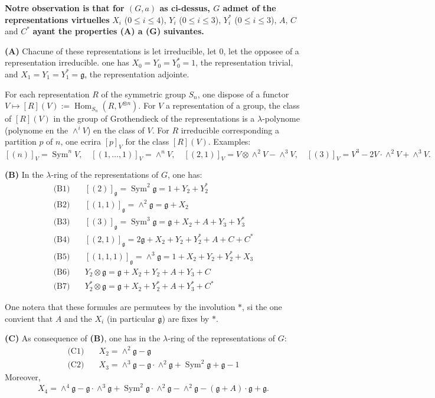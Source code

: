 \documentclass[11pt,a4paper]{article}
\DeclareMathOperator{\Sym}{Sym}
\DeclareMathOperator{\Hom}{Hom}
\newcommand{\frg}{\mathfrak{g}}
\begin{document}
\textbf{Notre observation is that for $(G, a)$ as ci-dessus, $G$ admet of the representations virtuelles}
$X_i$ ($0 \leq i \leq 4$), $Y_i$ ($0 \leq i \leq 3$), $Y_i^*$ ($0 \leq i \leq 3$), $A$, $C$ and $C^*$
\textbf{ayant the properties (A) a (G) suivantes.}

\medskip
\noindent\textbf{(A)} Chacune of these representations is let irreducible, let $0$, let the opposee of a representation irreducible. one has $X_0 = Y_0 = Y_0^* = 1$, the representation trivial, and $X_1 = Y_1 = Y_1^* = \frg$, the representation adjointe.

\medskip
\noindent For each representation $R$ of the symmetric group $S_n$, one dispose of a functor $V \mapsto [R](V) := \Hom_{S_n}(R, V^{\otimes n})$. For $V$ a representation of a group, the class of $[R](V)$ in the group of Grothendieck of the representations is a $\lambda$-polynome (polynome en the $\wedge^i V$) en the class of $V$. For $R$ irreducible corresponding a partition $p$ of $n$, one ecrira $[p]_V$ for the class $[R](V)$. Examples:
$$
[(n)]_V = \Sym^n V, \quad [(1, \ldots, 1)]_V = \wedge^n V, \quad [(2,1)]_V = V \otimes \wedge^2 V - \wedge^3 V, \quad [(3)]_V = V^3 - 2V \cdot \wedge^2 V + \wedge^3 V.
$$

\medskip
\noindent\textbf{(B)} In the $\lambda$-ring of the representations of $G$, one has:
\begin{align*}
\text{(B1)} \quad & [(2)]_{\frg} = \Sym^2 \frg = 1 + Y_2 + Y_2^* \\
\text{(B2)} \quad & [(1,1)]_{\frg} = \wedge^2 \frg = \frg + X_2 \\
\text{(B3)} \quad & [(3)]_{\frg} = \Sym^3 \frg = \frg + X_2 + A + Y_3 + Y_3^* \\
\text{(B4)} \quad & [(2,1)]_{\frg} = 2\frg + X_2 + Y_2 + Y_2^* + A + C + C^* \\
\text{(B5)} \quad & [(1,1,1)]_{\frg} = \wedge^3 \frg = 1 + X_2 + Y_2 + Y_2^* + X_3 \\
\text{(B6)} \quad & Y_2 \otimes \frg = \frg + X_2 + Y_2 + A + Y_3 + C \\
\text{(B7)} \quad & Y_2^* \otimes \frg = \frg + X_2 + Y_2^* + A + Y_3^* + C^*
\end{align*}

One notera that these formules are permutees by the involution $*$, si the one convient that $A$ and the $X_i$ (in particular $\frg$) are fixes by $*$.

\medskip
\noindent\textbf{(C)} As consequence of \textbf{(B)}, one has in the $\lambda$-ring of the representations of $G$:
\begin{align*}
\text{(C1)} \quad & X_2 = \wedge^2 \frg - \frg \\
\text{(C2)} \quad & X_3 = \wedge^3 \frg - \frg \cdot \wedge^2 \frg + \Sym^2 \frg + \frg - 1
\end{align*}
Moreover,
$$
X_4 = \wedge^4 \frg - \frg \cdot \wedge^3 \frg + \Sym^2 \frg \cdot \wedge^2 \frg - \wedge^2 \frg - (\frg + A) \cdot \frg + \frg.
$$
\end{document}
